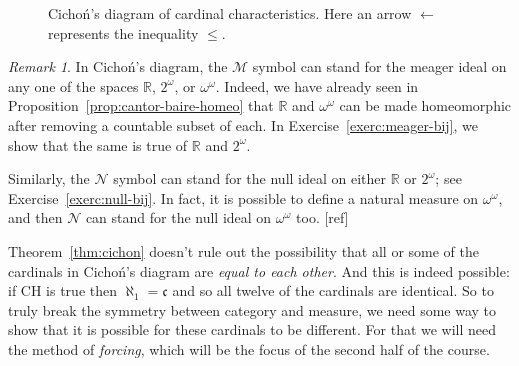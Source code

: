 \documentclass[11pt,oneside]{amsbook}
\newcommand{\R}{\mathbb R}
\newcommand{\Null}{\mathcal N}
\newcommand{\Meager}{\mathcal M}
\DeclareMathOperator{\add}{\mathsf{add}}
\DeclareMathOperator{\non}{\mathsf{non}}
\DeclareMathOperator{\cov}{\mathsf{cov}}
\DeclareMathOperator{\cof}{\mathsf{cof}}
\theoremstyle{definition}
\theoremstyle{plain}
\theoremstyle{definition}
\theoremstyle{remark}
\newtheorem{remark}[theorem]{Remark}
\numberwithin{equation}{section}
\numberwithin{figure}{section}
\begin{document}
\begin{figure}[h]
  \caption{Cicho\'n's diagram of cardinal characteristics. Here an arrow $\leftarrow$ represents the inequality $\leq$.\label{fig:cichon}}
\end{figure}

\begin{remark}
  In Cicho\'n's diagram, the $\Meager$ symbol can stand for the meager ideal on any one of the spaces $\R$, $2^\omega$, or $\omega^\omega$. Indeed, we have already seen in Proposition~\ref{prop:cantor-baire-homeo} that $\R$ and $\omega^\omega$ can be made homeomorphic after removing a countable subset of each. In Exercise~\ref{exerc:meager-bij}, we show that the same is true of $\R$ and $2^\omega$.

  Similarly, the $\Null$ symbol can stand for the null ideal on either $\R$ or $2^\omega$; see Exercise~\ref{exerc:null-bij}. In fact, it is possible to define a natural measure on $\omega^\omega$, and then $\Null$ can stand for the null ideal on $\omega^\omega$ too.
  [ref] %
\end{remark}

Theorem~\ref{thm:cichon} doesn't rule out the possibility that all or some of the cardinals in Cicho\'n's diagram are \emph{equal to each other}. And this is indeed possible: if CH is true then $\aleph_1=\mathfrak c$ and so all twelve of the cardinals are identical. So to truly break the symmetry between category and measure, we need some way to show that it is possible for these cardinals to be different. For that we will need the method of \emph{forcing}, which will be the focus of the second half of the course.
\end{document}
